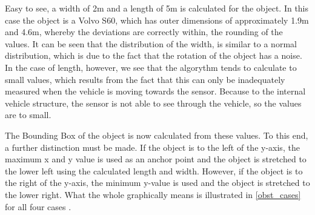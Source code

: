 \documentclass[11pt,oneside,openright]{mpreport}
\begin{document}

Easy to see, a width of 2m and a length of 5m is calculated for the object. In this case the object is a Volvo S60, which has outer dimensions of approximately
1.9m and 4.6m, whereby the deviations are correctly within, the rounding of the values. 
It can be seen that the distribution of the width, is similar to a normal distribution, which is due to the fact that the rotation of the object has a noise.
In the case of length, however, we see that the algorythm tends to calculate to small values, which results from the fact that this can only be inadequately
measured when the vehicle is moving towards the sensor. Because to the internal vehicle structure, the sensor is not able to see through the vehicle, so the
values are to small.


The Bounding Box of the object is now calculated from these values. To this end, a further distinction must be made.
If the object is to the left of the y-axis, the maximum x and y value is used as an anchor point and the object is stretched to the lower left using the calculated length and width.
However, if the object is to the right of the y-axis, the minimum y-value is used and the object is stretched to the lower right. 
What the whole graphically means is illustrated in \cref{obst_cases} for all four cases .
\end{document}
